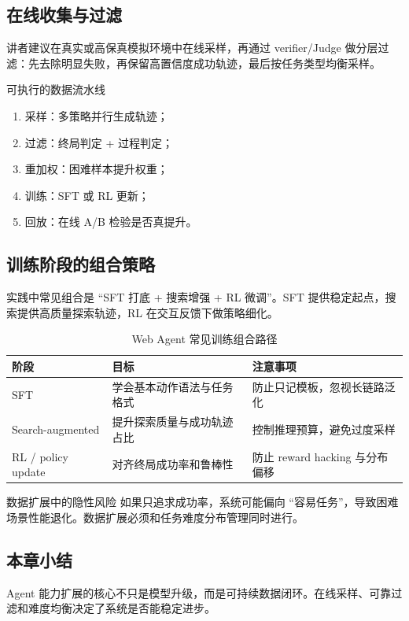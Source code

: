 \documentclass[a4paper]{article}
\begin{document}
\subsection{在线收集与过滤}
讲者建议在真实或高保真模拟环境中在线采样，再通过 verifier/Judge 做分层过滤：先去除明显失败，再保留高置信度成功轨迹，最后按任务类型均衡采样。

\begin{knowledgebox}{可执行的数据流水线}
\begin{enumerate}
    \item 采样：多策略并行生成轨迹；
    \item 过滤：终局判定 + 过程判定；
    \item 重加权：困难样本提升权重；
    \item 训练：SFT 或 RL 更新；
    \item 回放：在线 A/B 检验是否真提升。
\end{enumerate}
\end{knowledgebox}

\subsection{训练阶段的组合策略}
实践中常见组合是 ``SFT 打底 + 搜索增强 + RL 微调''。SFT 提供稳定起点，搜索提供高质量探索轨迹，RL 在交互反馈下做策略细化。

\begin{table}[H]
\centering
\small
\begin{tabular}{p{2.4cm}p{3.9cm}p{4.7cm}}
\toprule
\textbf{阶段} & \textbf{目标} & \textbf{注意事项} \\
\midrule
SFT & 学会基本动作语法与任务格式 & 防止只记模板，忽视长链路泛化 \\
Search-augmented & 提升探索质量与成功轨迹占比 & 控制推理预算，避免过度采样 \\
RL / policy update & 对齐终局成功率和鲁棒性 & 防止 reward hacking 与分布偏移 \\
\bottomrule
\end{tabular}
\caption{Web Agent 常见训练组合路径}
\end{table}

\begin{warningbox}{数据扩展中的隐性风险}
如果只追求成功率，系统可能偏向 ``容易任务''，导致困难场景性能退化。数据扩展必须和任务难度分布管理同时进行。
\end{warningbox}

\subsection{本章小结}
Agent 能力扩展的核心不只是模型升级，而是可持续数据闭环。在线采样、可靠过滤和难度均衡决定了系统是否能稳定进步。
\end{document}
